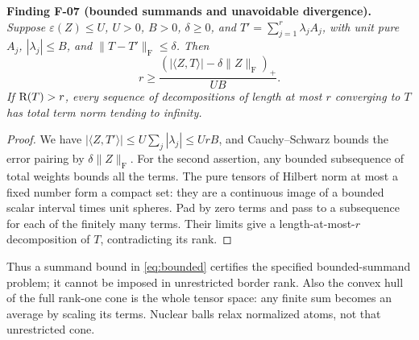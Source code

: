 \documentclass[11pt]{article}
\newcommand{\HS}[1]{\lVert #1\rVert_{\mathrm F}}
\newcommand{\eps}{\varepsilon}
\newcommand{\abs}[1]{\lvert#1\rvert}
\newenvironment{finding}[2]{\par\medskip\noindent\textbf{Finding #1 (#2).}\ \itshape}{\par\medskip}
\begin{document}
\begin{finding}{F-07}{bounded summands and unavoidable divergence}
Suppose $\eps(Z)\leq U$, $U>0$, $B>0$, $\delta\geq0$, and
$T'=\sum_{j=1}^r\lambda_j A_j$, with unit pure $A_j$,
$|\lambda_j|\leq B$, and $\HS{T-T'}\leq\delta$. Then
\begin{equation}\label{eq:bounded}
 r\geq
 \frac{(\abs{\langle Z,T\rangle}-\delta\HS Z)_+}{UB}.
\end{equation}
If $\mathrm R(T)>r$, every sequence of decompositions of length at most
$r$ converging to $T$ has total term norm tending to infinity.
\end{finding}
\begin{proof}
We have $|\langle Z,T'\rangle|\leq U\sum_j|\lambda_j|\leq UrB$,
and Cauchy--Schwarz bounds the error pairing by $\delta\HS Z$.
For the second assertion, any bounded subsequence of total weights
bounds all the terms. The pure tensors of Hilbert norm at most
a fixed number form a compact set: they are a continuous image of
a bounded scalar interval times unit spheres. Pad by zero terms
and pass to a subsequence for each of the finitely many terms.
Their limits give a length-at-most-$r$ decomposition of $T$,
contradicting its rank.
\end{proof}
Thus a summand bound in \eqref{eq:bounded} certifies the specified
bounded-summand problem; it cannot be imposed in unrestricted border
rank. Also the convex hull of the full rank-one cone is the whole
tensor space: any finite sum becomes an average by scaling its terms.
Nuclear balls relax normalized atoms, not that unrestricted cone.
\end{document}
